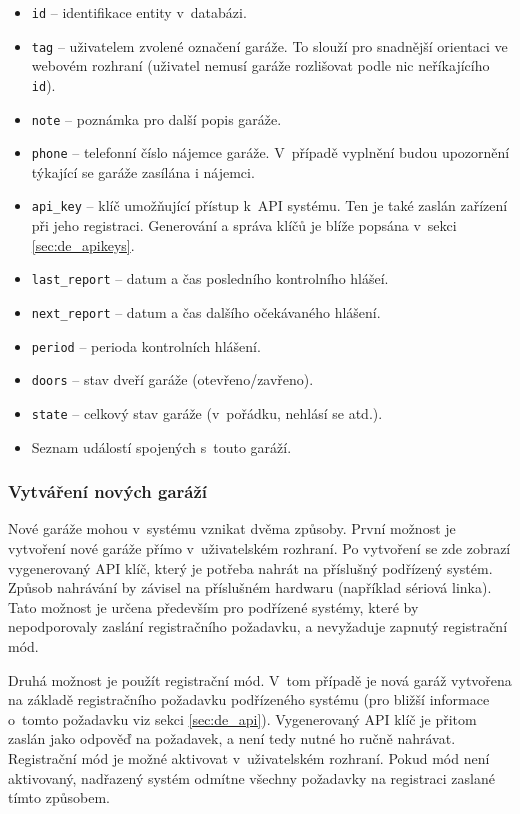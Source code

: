 \begin{itemize}
    \item \texttt{id} -- identifikace entity v~databázi.
    \item \texttt{tag} -- uživatelem zvolené označení garáže. To slouží pro snadnější orientaci ve webovém rozhraní (uživatel nemusí garáže rozlišovat podle nic neříkajícího \texttt{id}).
    \item \texttt{note} -- poznámka pro další popis garáže.
    \item \texttt{phone} -- telefonní číslo nájemce garáže. V~případě vyplnění budou upozornění týkající se garáže zasílána i nájemci.
    \item \texttt{api\_key} -- klíč umožňující přístup k~API systému. Ten je také zaslán zařízení při jeho registraci. Generování a správa klíčů je blíže popsána v~sekci \ref{sec:de_apikeys}.
    \item \texttt{last\_report} -- datum a čas posledního kontrolního hlášeí.
    \item \texttt{next\_report} -- datum a čas dalšího očekávaného hlášení.
    \item \texttt{period} -- perioda kontrolních hlášení.
    \item \texttt{doors} -- stav dveří garáže (otevřeno/zavřeno).
    \item \texttt{state} -- celkový stav garáže (v~pořádku, nehlásí se atd.).
    \item Seznam událostí spojených s~touto garáží.
\end{itemize}

\subsubsection{Vytváření nových garáží}
\label{sec:de_add_garage}

Nové garáže mohou v~systému vznikat dvěma způsoby. První možnost je vytvoření nové garáže přímo v~uživatelském rozhraní. Po vytvoření se zde zobrazí vygenerovaný API klíč, který je potřeba nahrát na příslušný podřízený systém. Způsob nahrávání by závisel na příslušném hardwaru (například sériová linka). Tato možnost je určena především pro podřízené systémy, které by nepodporovaly zaslání registračního požadavku, a nevyžaduje zapnutý registrační mód.

Druhá možnost je použít registrační mód. V~tom případě je nová garáž vytvořena na základě registračního požadavku podřízeného systému (pro bližší informace o~tomto požadavku viz sekci \ref{sec:de_api}). Vygenerovaný API klíč je přitom zaslán jako odpověď na požadavek, a není tedy nutné ho ručně nahrávat. Registrační mód je možné aktivovat v~uživatelském rozhraní. Pokud mód není aktivovaný, nadřazený systém odmítne všechny požadavky na registraci zaslané tímto způsobem.

